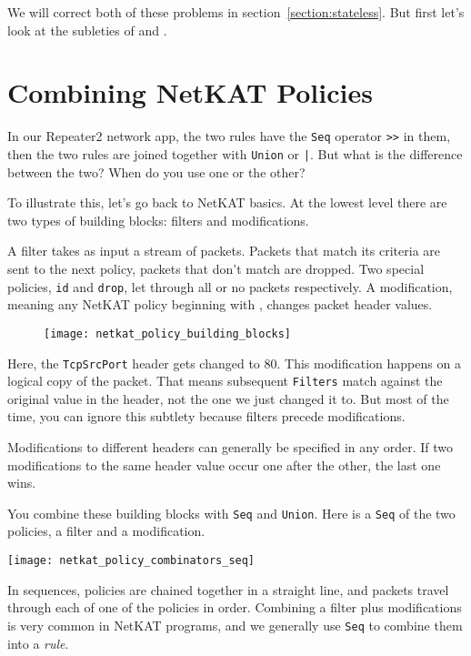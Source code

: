 We will correct both of these problems in section~\ref{section:stateless}.  
But first let's look at the subleties of  and .

\section{Combining NetKAT Policies}
\label{section:combining}

In our Repeater2 network app, the two rules have the \texttt{Seq} operator \texttt{>>} in them, then the two rules 
are joined together with \texttt{Union} or \texttt{|}.  
But what is the difference between the two?
When do you use one or the other?

To illustrate this, let's go back to NetKAT basics.  At the lowest level there are two types
of building blocks: filters and modifications.  

A filter takes as input a stream of packets.  Packets that match its criteria are
sent to the next policy, packets that don't match are dropped.  Two special policies, 
\texttt{id} and \texttt{drop}, let through all or no packets respectively.  
A modification, meaning any NetKAT policy beginning with , 
changes packet header values.  

\begin{figure}[h]
\centering
\texttt{[image: netkat\_policy\_building\_blocks]}
\end{figure}

Here, the \texttt{TcpSrcPort} header gets
changed to 80.  This modification happens on a logical copy of the packet.  That means subsequent \texttt{Filters} 
match against the original  
value in the header, not the one we just changed it to.  But most of the 
time, you can ignore this subtlety because filters precede modifications.

Modifications to different headers can generally be specified in any order.  If two modifications to the same header 
value occur one after the other, the last one wins.  

You combine these building blocks with \texttt{Seq} and \texttt{Union}.
Here is a \texttt{Seq} of the two policies, a filter and a modification.   

\texttt{[image: netkat\_policy\_combinators\_seq]}

In sequences, policies
are chained together in a straight line, and packets travel through each of one of the policies in order.  
Combining a filter plus modifications is very common in NetKAT programs, and we generally
use \texttt{Seq} to combine them into a \emph{rule}.  

